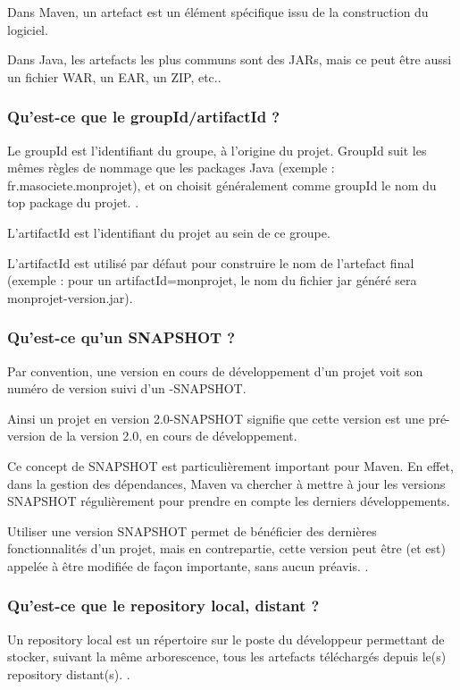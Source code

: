  Dans Maven, un artefact est un élément spécifique issu de la construction du logiciel. 
 
 Dans Java, les artefacts les plus communs sont des JARs, mais ce peut être aussi un fichier WAR, un EAR, un ZIP, etc.\parencite{maven}.

  
 
     \subsubsection{Qu'est-ce que le groupId/artifactId ?}
   Le groupId est l'identifiant du groupe, à l'origine du projet. GroupId suit les mêmes règles de nommage que les packages  Java (exemple : fr.masociete.monprojet), et on choisit généralement comme groupId le nom du top package du projet. \parencite{maven}.
   
   L'artifactId est l'identifiant du projet au sein de ce groupe. 
   
   L'artifactId est utilisé par défaut pour construire le nom de l'artefact final (exemple : pour un artifactId=monprojet, le nom du fichier jar généré sera monprojet-version.jar).  \subsubsection{Qu'est-ce qu'un SNAPSHOT ?}
 
    Par convention, une version en cours de développement d'un projet voit son numéro de version suivi d'un -SNAPSHOT. 
    
    Ainsi un projet en version 2.0-SNAPSHOT signifie que cette version est une pré-version de la version 2.0, en cours de développement. 
    
    Ce concept de SNAPSHOT est particulièrement important pour Maven. En effet, dans la gestion des dépendances, Maven va chercher à mettre à jour les versions SNAPSHOT régulièrement pour prendre en compte les derniers développements. 
    
    Utiliser une version SNAPSHOT permet de bénéficier des dernières fonctionnalités d'un projet, mais en contrepartie, cette version peut être (et est) appelée à être modifiée de façon importante, sans aucun préavis. \parencite{maven}.
       \subsubsection{Qu'est-ce que le repository local, distant ?}
    Un repository local est un répertoire sur le poste du développeur permettant de stocker, suivant la même arborescence, tous les artefacts téléchargés depuis le(s) repository distant(s). \cite{maven}.
    

